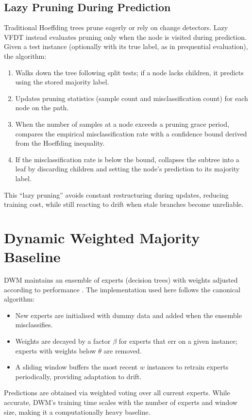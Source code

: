 \subsection{Lazy Pruning During Prediction}
Traditional Hoeffding trees prune eagerly or rely on change detectors.  Lazy VFDT instead evaluates pruning only when the node is visited during prediction.  Given a test instance (optionally with its true label, as in prequential evaluation), the algorithm:
\begin{enumerate}
    \item Walks down the tree following split tests; if a node lacks children, it predicts using the stored majority label.
    \item Updates pruning statistics (sample count and misclassification count) for each node on the path.
    \item When the number of samples at a node exceeds a pruning grace period, compares the empirical misclassification rate with a confidence bound derived from the Hoeffding inequality.
    \item If the misclassification rate is below the bound, collapses the subtree into a leaf by discarding children and setting the node's prediction to its majority label.
\end{enumerate}
This ``lazy pruning'' avoids constant restructuring during updates, reducing training cost, while still reacting to drift when stale branches become unreliable.

\section{Dynamic Weighted Majority Baseline}
DWM maintains an ensemble of experts (decision trees) with weights adjusted according to performance \cite{kolter2007dwm}.  The implementation used here follows the canonical algorithm:
\begin{itemize}
    \item New experts are initialised with dummy data and added when the ensemble misclassifies.
    \item Weights are decayed by a factor \( \beta \) for experts that err on a given instance; experts with weights below \(\theta\) are removed.
    \item A sliding window buffers the most recent \(w\) instances to retrain experts periodically, providing adaptation to drift.
\end{itemize}
Predictions are obtained via weighted voting over all current experts.  While accurate, DWM's training time scales with the number of experts and window size, making it a computationally heavy baseline.

